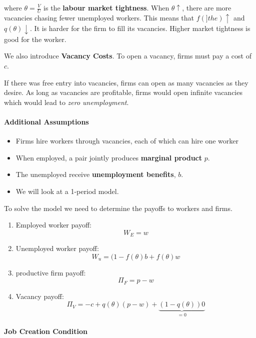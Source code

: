 \documentclass[11pt]{article}
\begin{document}
where $\theta=\frac{V}{U}$ is the \textbf{labour market tightness}. When $\theta\uparrow$, there are more vacancies chasing fewer unemployed workers. This means that $f(]the
)\uparrow$ and $q(\theta)\downarrow$. It is harder for the firm to fill its vacancies. Higher market tightness is good for the worker.

We also introduce \textbf{Vacancy Costs}. To open a vacancy, firms must pay a cost of $c$. 

\begin{note}
    If there was free entry into vacancies, firms can open as many vacancies as they desire. As long as vacancies are profitable, firms would open infinite vacancies which would lead to \textit{zero unemployment}.
\end{note}

\paragraph{Additional Assumptions} \mbox{}

\begin{itemize}
    \item Firms hire workers through vacancies, each of which can hire one worker
    \item  When employed, a pair jointly produces \textbf{marginal product} $p$.
    \item  The unemployed receive \textbf{unemployment benefits}, $b$.
    \item We will look at a 1-period model.
\end{itemize}

To solve the model we need to determine the payoffs to workers and firms.

\begin{enumerate}
    \item Employed worker payoff:
    \[W_E = w\]

    \item  Unemployed worker payoff:
    \[W_u = (1-f(\theta)b + f(\theta)w\]

    \item productive firm payoff:
    \[\Pi_F = p-w\]

    \item  Vacancy payoff:
    \[\Pi_V = -c + q(\theta)(p-w) + \underset{=0}{\underbrace{(1-q(\theta))0}}\]
\end{enumerate}

\paragraph{Job Creation Condition}\mbox{}
\end{document}
